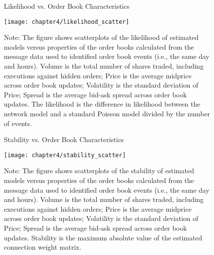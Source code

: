 		\begin{figure}[ht!]
			\small
			\linespread{1}
			\centering
			\captionsetup{labelsep=colon, font=footnotesize, justification=centerfirst, width=\linewidth}
			\caption{Likelihood vs. Order Book Characteristics}
			\label{fig:likelihood_scatter}
			\texttt{[image: chapter4/likelihood\_scatter]}
			\captionsetup{position=below, font=footnotesize, justification=justified, width=\linewidth}
			\caption*{Note: The figure shows scatterplots of the likelihood of estimated models versus properties of the order books calculated from the message data used to identified order book events (i.e., the same day and hours). Volume is the total number of shares traded, including executions against hidden orders; Price is the average midprice across order book updates; Volatility is the standard deviation of Price; Spread is the average bid-ask spread across order book updates. The likelihood is the difference in likelihood between the network model and a standard Poisson model divided by the number of events.}
		\end{figure}

		\begin{figure}[ht!]
			\small
			\linespread{1}
			\centering
			\captionsetup{labelsep=colon, font=footnotesize, justification=centerfirst, width=\linewidth}
			\caption{Stability vs. Order Book Characteristics}
			\label{fig:stability_scatter}
			\texttt{[image: chapter4/stability\_scatter]}
			\captionsetup{position=below, font=footnotesize, justification=justified, width=\linewidth}
			\caption*{Note: The figure shows scatterplots of the stability of estimated models versus properties of the order books calculated from the message data used to identified order book events (i.e., the same day and hours). Volume is the total number of shares traded, including executions against hidden orders; Price is the average midprice across order book updates; Volatility is the standard deviation of Price; Spread is the average bid-ask spread across order book updates. Stability is the maximum absolute value of the estimated connection weight matrix.}
		\end{figure}

